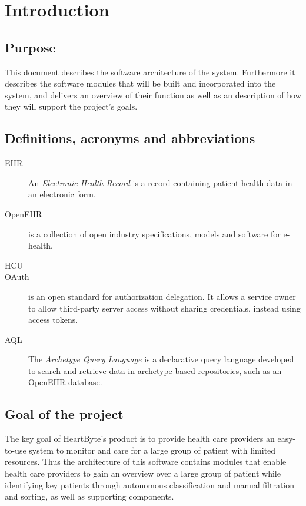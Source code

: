 \documentclass{article}
\begin{document}
\clearpage

\tableofcontents
\clearpage

\section{Introduction}
\subsection{Purpose}
This document describes the software architecture of the system. Furthermore it describes the software modules that will be built and incorporated into the system, and delivers an overview of their function as well as an description of how they will support the project's goals.

\subsection{Definitions, acronyms and abbreviations}
\begin{description}
\item [EHR] An \emph{Electronic Health Record} is a record containing patient health data in an electronic form.
\item [OpenEHR] is a collection of open industry specifications, models and software for e-health.
\item [HCU] 
\item [OAuth] is an open standard for authorization delegation. It allows a service owner to allow third-party server access without sharing credentials, instead using access tokens. 
\item [AQL] The \emph{Archetype Query Language} is a declarative query language developed to search and retrieve data in archetype-based repositories, such as an OpenEHR-database.
\end{description}

\subsection{Goal of the project}
The key goal of HeartByte's product is to provide health care providers an easy-to-use system to monitor and care for a large group of patient with limited resources. Thus the architecture of this software contains modules that enable health care providers to gain an overview over a large group of patient while identifying key patients through autonomous classification and manual filtration and sorting, as well as supporting components.
\end{document}
